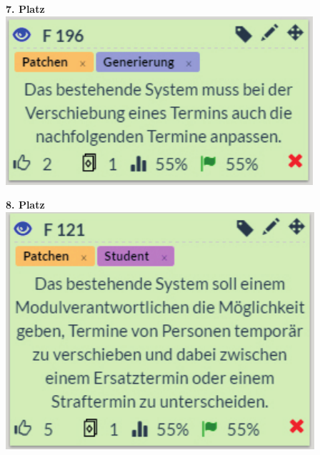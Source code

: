 \begin{minipage}[t]{.5\textwidth}
	\centering
   \vspace{16pt}
   		\textbf{7. Platz}\\
   		\vspace{16pt}
		\includegraphics[width=\textwidth]{images/7.pdf}
\end{minipage}
\begin{minipage}[t]{.5\textwidth}
	\centering
   \vspace{16pt}
   		\textbf{8. Platz}\\
   		\vspace{16pt}
		\includegraphics[width=\textwidth]{images/8.pdf}
\end{minipage}




